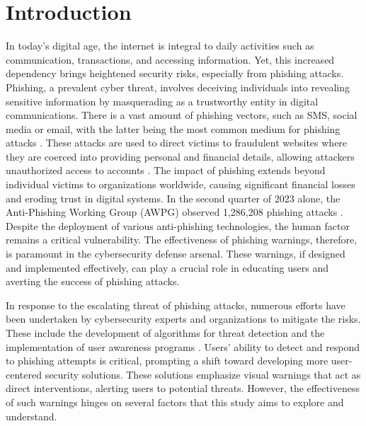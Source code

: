 \documentclass[
  a4paper,  %
  twoside,  %
  bibliography=totoc,
  headsepline,
  cleardoublepage=empty,
  parskip=half,
  draft=false
]{scrbook}
\begin{document}
\chapter{Introduction}
\label{sec:introduction}
In today's digital age, the internet is integral to daily activities such as communication, transactions, and accessing information. Yet, this increased dependency brings heightened security risks, especially from phishing attacks. Phishing, a prevalent cyber threat, involves deceiving individuals into revealing sensitive information by masquerading as a trustworthy entity in digital communications. There is a vast amount of phishing vectors, such as SMS, social media or email, with the latter being the most common medium for phishing attacks \cite{verizon}. These attacks are used to direct victims to fraudulent websites where they are coerced into providing personal and financial details, allowing attackers unauthorized access to accounts \cite{Wang2012}. \newline 
The impact of phishing extends beyond individual victims to organizations worldwide, causing significant financial losses and eroding trust in digital systems. In the second quarter of 2023 alone, the Anti-Phishing Working Group (AWPG) observed 1,286,208 phishing attacks \cite{apwg}. Despite the deployment of various anti-phishing technologies, the human factor remains a critical vulnerability. The effectiveness of phishing warnings, therefore, is paramount in the cybersecurity defense arsenal. These warnings, if designed and implemented effectively, can play a crucial role in educating users and averting the success of phishing attacks. \par
In response to the escalating threat of phishing attacks, numerous efforts have been undertaken by cybersecurity experts and organizations to mitigate the risks. These include the development of algorithms for threat detection \cite{thakur} and the implementation of user awareness programs \cite{jampen}. Users' ability to detect and respond to phishing attempts is critical, prompting a shift toward developing more user-centered security solutions. These solutions emphasize visual warnings that act as direct interventions, alerting users to potential threats. However, the effectiveness of such warnings hinges on several factors that this study aims to explore and understand. \par
\end{document}
